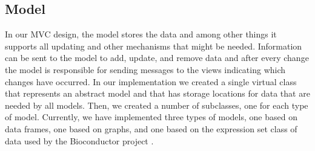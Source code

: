 \documentclass[11pt]{article}
\newcommand{\Rfunction}[1]{{\textsf{#1}}}
\newcommand{\Rslot}[1]{\textsl{#1}}
\newcommand{\Rclass}[1]{\texttt{#1}}
\begin{document}
\subsection{Model}
\label{Ssec:OneModel}

In our MVC design, the model stores the data and among other things it
supports all updating and other mechanisms that might be needed.
Information can be sent to the model to add, update, and remove data
and after every change the model is responsible for sending messages
to the views indicating which changes have occurred.  In our
implementation we created a single virtual class that represents an
abstract model and that has storage locations for data that are
needed by all models.  Then, we created a number of subclasses, one for
each type of model.  Currently, we have implemented three types of models, 
one based on data frames, one based on graphs, and one based on the 
expression set class of data used by the Bioconductor project \citep{BIOC}.





\end{document}
